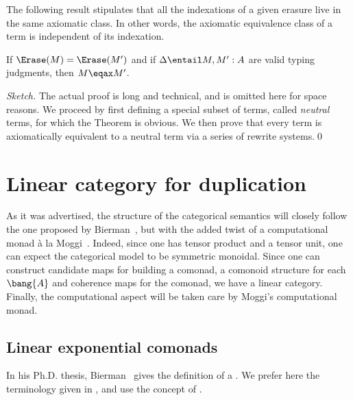 \documentclass{llncs}
\begin{document}
The following result stipulates that all the indexations of a given
erasure live in the same axiomatic class. In other words, the
axiomatic equivalence class of a term is independent of its
indexation.

\begin{theorem}\label{the:eraseimpliesax}
  If $\Erase(M)=\Erase(M')$ and if $\Delta\entail M,M':A$ are valid
  typing judgments, then $M\eqax M'$.
\end{theorem}

\begin{proof}[Sketch] 
  The actual proof is long and technical, and is omitted here for
  space reasons. We proceed by first defining a special subset of
  terms, called {\em neutral} terms, for which the Theorem is obvious.
  We then prove that every term is axiomatically equivalent to a
  neutral term via a series of rewrite systems.\qed
\end{proof}




\section{Linear category for duplication}
\label{sec:lincat}

As it was advertised, the structure of the categorical semantics will
closely follow the one proposed by Bierman~\cite{bierman93intuitionistic}, but
with the added twist of a computational monad {\`a} la
Moggi~\cite{moggi91notions}.
Indeed, since one has tensor product and a tensor unit, one can
expect the categorical model to be symmetric monoidal. Since
one can construct candidate maps for building a comonad, a comonoid
structure for each $\bang{A}$ and coherence maps for the comonad, we
have a linear category.
Finally, the computational aspect will be taken care by Moggi's
computational monad. 


\subsection{Linear exponential comonads}

In his Ph.D. thesis, Bierman~\cite{bierman93intuitionistic} gives the
definition of a . We prefer here the
terminology given in \cite{schalk04what}, and use the concept of
.
\end{document}
